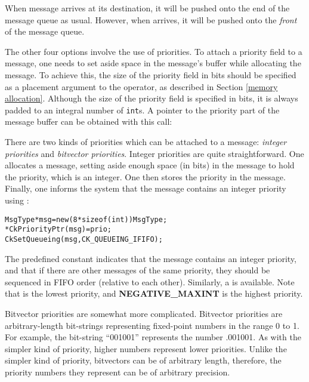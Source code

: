 When message  arrives at its destination, it will be pushed onto the
end of the message queue as usual.  However, when  arrives, it will be
pushed onto the {\em front} of the message queue.

The other four options involve the use of priorities.  To
attach a priority field to a message, one needs to set aside space in the
message's buffer while allocating the message.  To
achieve this, the size of the priority field in bits
should be specified as a placement argument to the  operator, as
described in Section \ref{memory allocation}.  Although the size of the
priority field is specified in bits, it is always padded to an integral number
of {\tt int}s.  A pointer to the priority part of the message buffer can be
obtained with this call:


There are two kinds of priorities which can be attached to a message:
{\sl integer priorities} and {\sl bitvector
priorities}.  Integer priorities are quite
straightforward.  One allocates a message, setting aside enough space
(in bits) in the message to hold the priority, which is an integer.
One then stores the priority in the message.  Finally, one informs the
system that the message contains an integer priority using
:

\begin{alltt}
  MsgType *msg = new (8*sizeof(int)) MsgType;
  *CkPriorityPtr(msg) = prio;
  CkSetQueueing(msg, CK_QUEUEING_IFIFO);
\end{alltt}

The predefined constant   indicates that the
message contains an integer priority, and that if there are other
messages of the same priority, they should be sequenced in FIFO order
(relative to each other).  Similarly, a   is
available.  Note that   is the lowest priority, and {\bf
NEGATIVE\_MAXINT} is the highest priority.

Bitvector priorities are somewhat more complicated.  Bitvector
priorities are arbitrary-length bit-strings representing fixed-point
numbers in the range 0 to 1.  For example, the bit-string ``001001''
represents the number .001001\raisebox{-.5ex}{\scriptsize binary}.  As
with the simpler kind of priority, higher numbers represent lower
priorities.  Unlike the simpler kind of priority, bitvectors can be of
arbitrary length, therefore, the priority numbers they represent can
be of arbitrary precision.

